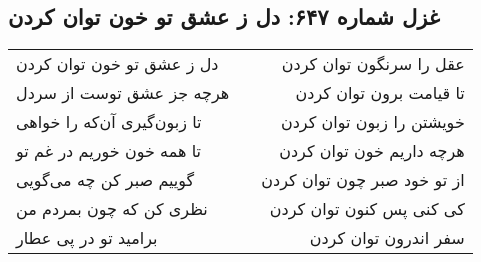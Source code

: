 \begin{center}
\section*{غزل شماره ۶۴۷: دل ز عشق تو خون توان کردن}
\label{sec:647}
\begin{longtable}{l p{0.5cm} r}
دل ز عشق تو خون توان کردن
&&
عقل را سرنگون توان کردن
\\
هرچه جز عشق توست از سردل
&&
تا قیامت برون توان کردن
\\
تا زبون‌گیری آن‌که را خواهی
&&
خویشتن را زبون توان کردن
\\
تا همه خون خوریم در غم تو
&&
هرچه داریم خون توان کردن
\\
گوییم صبر کن چه می‌گویی
&&
از تو خود صبر چون توان کردن
\\
نظری کن که چون بمردم من
&&
کی کنی پس کنون توان کردن
\\
برامید تو در پی عطار
&&
سفر اندرون توان کردن
\\
\end{longtable}
\end{center}
